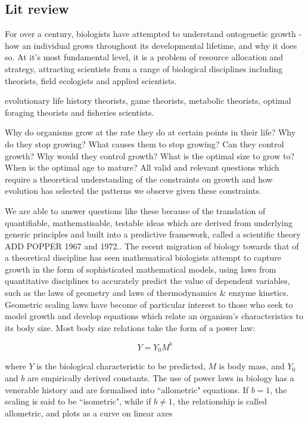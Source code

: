 \documentclass[a4paper]{article} %
\begin{document}
    \subsection{Lit review}
        For over a century, biologists have attempted to understand ontogenetic growth - how an individual grows throughout its developmental lifetime, and why it does so. At it's most fundamental level, it is a problem of resource allocation and strategy, attracting scientists from a range of biological disciplines including theorists, field ecologists and applied scientists.
        
        evolutionary life history theorists, game theorists, metabolic theorists, optimal foraging theorists and fisheries scientists. 
        
        Why do organisms grow at the rate they do at certain points in their life? Why do they stop growing? What causes them to stop growing? Can they control growth? Why would they control growth? What is the optimal size to grow to? When is the optimal age to mature? All valid and relevant questions which require a theoretical understanding of the constraints on growth and how evolution has selected the patterns we observe given these constraints.

        We are able to answer questions like these because of the translation of quantifiable, mathematisable, testable ideas which are derived from underlying generic principles and built into a predictive framework, called a scientific theory \autocite{peters1983, West2011}ADD POPPER 1967 and 1972.. The recent migration of biology towards that of a theoretical discipline has seen mathematical biologists attempt to capture growth in the form of sophisticated mathematical models, using laws from quantitative disciplines to accurately predict the value of dependent variables, such as the laws of geometry and laws of thermodynamics \& enzyme kinetics. Geometric scaling laws have become of particular interest to those who seek to model growth and develop equations which relate an organism's characteristics to its body size. Most body size relations take the form of a power law:

        \begin{equation}
            Y = Y_0 M^b
        \end{equation}

        where $Y$ is the biological characteristic to be predicted, $M$ is body mass, and $Y_0$ and $b$ are empirically derived constants. The use of power laws in biology has a venerable history and are formalised into ``allometric" equations. If $b = 1$, the scaling is said to be ``isometric", while if $b \neq 1$, the relationship is called allometric, and plots as a curve on linear axes \autocite{brown2000-scaling-book}
\end{document}

